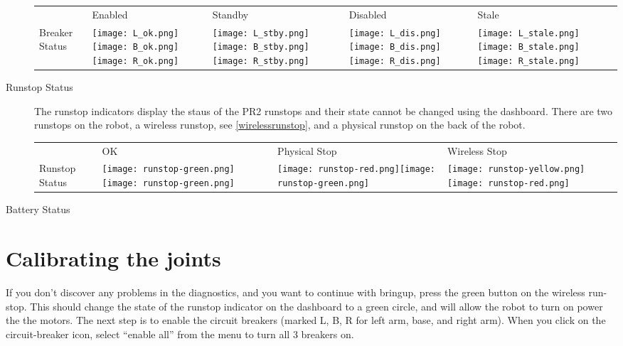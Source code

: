 \begin{description}
    \begin{tabular}{m{2.6cm}SSSS}
     & Enabled & Standby & Disabled & Stale\\
    Breaker Status & \texttt{[image: L\_ok.png]}\texttt{[image: B\_ok.png]}\texttt{[image: R\_ok.png]}&
                     \texttt{[image: L\_stby.png]}\texttt{[image: B\_stby.png]}\texttt{[image: R\_stby.png]}&
                     \texttt{[image: L\_dis.png]}\texttt{[image: B\_dis.png]}\texttt{[image: R\_dis.png]}&
                     \texttt{[image: L\_stale.png]}\texttt{[image: B\_stale.png]}\texttt{[image: R\_stale.png]}\\
   \end{tabular}



\item[Runstop Status] The runstop indicators display the staus of the PR2 runstops and their state cannot be changed using the dashboard. 
There are two runstops on the robot, a wireless runstop, see \ref{wirelessrunstop}, and a physical runstop on the back of the robot.\\

    \begin{tabular}{m{2.6cm}SSS}
     & OK & Physical Stop & Wireless Stop\\
    Runstop Status & \texttt{[image: runstop-green.png]}\texttt{[image: runstop-green.png]}&
                     \texttt{[image: runstop-red.png]}\texttt{[image: runstop-green.png]}&
                     \texttt{[image: runstop-yellow.png]}\texttt{[image: runstop-red.png]}\\
   \end{tabular}


\item[Battery Status]

\end{description}

\section{Calibrating the joints}
If you don't discover any problems in the diagnostics, and you want to continue with bringup, press the green button on the wireless run-stop.  This should change the state of the runstop indicator on the dashboard to a green circle, and will allow the robot to turn on power the the motors.  The next step is to enable the circuit breakers (marked L, B, R for left arm, base, and right arm).  When you click on the circuit-breaker icon, select ``enable all'' from the menu to turn all 3 breakers on.

